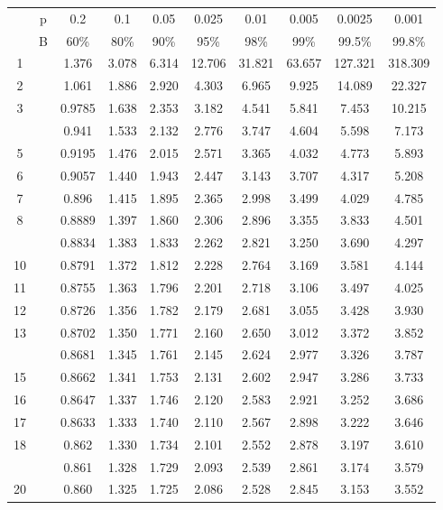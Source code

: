 \documentclass[
]{book}
\begin{document}
\begin{tabular}{cccccccccc}
\toprule
 &  &  &  &  &  &  &  &  & \\
\midrule
 & p & 0.2 & 0.1 & 0.05 & 0.025 & 0.01 & 0.005 & 0.0025 & 0.001\\
 & B & 60\% & 80\% & 90\% & 95\% & 98\% & 99\% & 99.5\% & 99.8\%\\
1 &  & 1.376 & 3.078 & 6.314 & 12.706 & 31.821 & 63.657 & 127.321 & 318.309\\
2 &  & 1.061 & 1.886 & 2.920 & 4.303 & 6.965 & 9.925 & 14.089 & 22.327\\
3 &  & 0.9785 & 1.638 & 2.353 & 3.182 & 4.541 & 5.841 & 7.453 & 10.215\\
\addlinespace
4 &  & 0.941 & 1.533 & 2.132 & 2.776 & 3.747 & 4.604 & 5.598 & 7.173\\
5 &  & 0.9195 & 1.476 & 2.015 & 2.571 & 3.365 & 4.032 & 4.773 & 5.893\\
6 &  & 0.9057 & 1.440 & 1.943 & 2.447 & 3.143 & 3.707 & 4.317 & 5.208\\
7 &  & 0.896 & 1.415 & 1.895 & 2.365 & 2.998 & 3.499 & 4.029 & 4.785\\
8 &  & 0.8889 & 1.397 & 1.860 & 2.306 & 2.896 & 3.355 & 3.833 & 4.501\\
\addlinespace
9 &  & 0.8834 & 1.383 & 1.833 & 2.262 & 2.821 & 3.250 & 3.690 & 4.297\\
10 &  & 0.8791 & 1.372 & 1.812 & 2.228 & 2.764 & 3.169 & 3.581 & 4.144\\
11 &  & 0.8755 & 1.363 & 1.796 & 2.201 & 2.718 & 3.106 & 3.497 & 4.025\\
12 &  & 0.8726 & 1.356 & 1.782 & 2.179 & 2.681 & 3.055 & 3.428 & 3.930\\
13 &  & 0.8702 & 1.350 & 1.771 & 2.160 & 2.650 & 3.012 & 3.372 & 3.852\\
\addlinespace
14 &  & 0.8681 & 1.345 & 1.761 & 2.145 & 2.624 & 2.977 & 3.326 & 3.787\\
15 &  & 0.8662 & 1.341 & 1.753 & 2.131 & 2.602 & 2.947 & 3.286 & 3.733\\
16 &  & 0.8647 & 1.337 & 1.746 & 2.120 & 2.583 & 2.921 & 3.252 & 3.686\\
17 &  & 0.8633 & 1.333 & 1.740 & 2.110 & 2.567 & 2.898 & 3.222 & 3.646\\
18 &  & 0.862 & 1.330 & 1.734 & 2.101 & 2.552 & 2.878 & 3.197 & 3.610\\
\addlinespace
19 &  & 0.861 & 1.328 & 1.729 & 2.093 & 2.539 & 2.861 & 3.174 & 3.579\\
20 &  & 0.860 & 1.325 & 1.725 & 2.086 & 2.528 & 2.845 & 3.153 & 3.552\\

\end{tabular}
\end{document}
